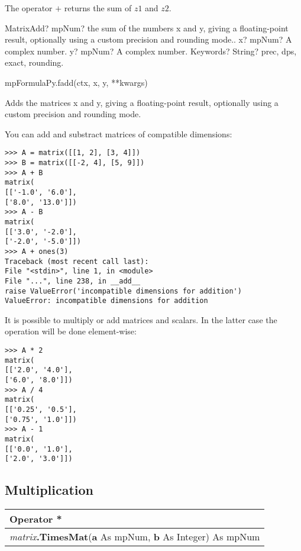 \vspace{0.3cm}
The operator $+$ returns the sum of $z1$ and $z2$.


\vspace{0.3cm}
\begin{mpFunctionsExtract}
	\mpFunctionThree
	{MatrixAdd? mpNum? the sum of the numbers x and y, giving a floating-point result, optionally using a custom precision and rounding mode..}
	{x? mpNum? A complex number.}
	{y? mpNum? A complex number.}
	{Keywords? String? prec, dps, exact, rounding.}	
\end{mpFunctionsExtract}

\vspace{0.3cm}

mpFormulaPy.fadd(ctx, x, y, **kwargs)

\vpara
Adds the matrices x and y, giving a floating-point result, optionally using a custom precision and rounding mode.


You can add and substract matrices of compatible dimensions:

\begin{lstlisting}
>>> A = matrix([[1, 2], [3, 4]])
>>> B = matrix([[-2, 4], [5, 9]])
>>> A + B
matrix(
[['-1.0', '6.0'],
['8.0', '13.0']])
>>> A - B
matrix(
[['3.0', '-2.0'],
['-2.0', '-5.0']])
>>> A + ones(3)
Traceback (most recent call last):
File "<stdin>", line 1, in <module>
File "...", line 238, in __add__
raise ValueError('incompatible dimensions for addition')
ValueError: incompatible dimensions for addition
\end{lstlisting}

It is possible to multiply or add matrices and scalars. In the latter case the operation will be done element-wise:

\begin{lstlisting}
>>> A * 2
matrix(
[['2.0', '4.0'],
['6.0', '8.0']])
>>> A / 4
matrix(
[['0.25', '0.5'],
['0.75', '1.0']])
>>> A - 1
matrix(
[['0.0', '1.0'],
['2.0', '3.0']])
\end{lstlisting}





\subsection{Multiplication}
\begin{tabular}{p{481pt}}
	\toprule
	\textsf{Operator \textbf{*}}\index{Multiprecision Functions!*} \\
	\midrule
	\textsf{\textit{matrix}\textbf{.TimesMat}(\textbf{a} As mpNum, \textbf{b} As Integer) As mpNum}\index{Multiprecision Functions!.TimesMat} \\
	\bottomrule
\end{tabular}

